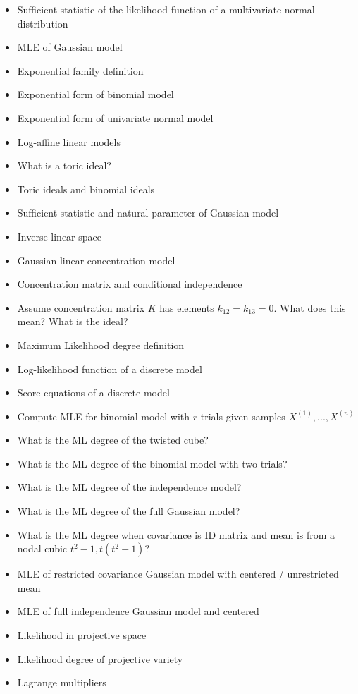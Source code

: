 \documentclass[a4paper, 11pt]{article}
\begin{document}
\begin{itemize}
  \item Sufficient statistic of the likelihood function of a multivariate normal distribution
  \item MLE of Gaussian model
  \item Exponential family definition
  \item Exponential form of binomial model
  \item Exponential form of univariate normal model
  \item Log-affine linear models
  \item What is a toric ideal?
  \item Toric ideals and binomial ideals
  \item Sufficient statistic and natural parameter of Gaussian model
  \item Inverse linear space
  \item Gaussian linear concentration model
  \item Concentration matrix and conditional independence
  \item Assume concentration matrix \( K \) has elements \( k_{12} = k_{13} = 0 \). What does this mean? What is the ideal?
  \item Maximum Likelihood degree definition
  \item Log-likelihood function of a discrete model 
  \item Score equations of a discrete model
  \item Compute MLE for binomial model with \( r \) trials given samples \( X^{(1)}, ..., X^{(n)} \)
  \item What is the ML degree of the twisted cube?
  \item What is the ML degree of the binomial model with two trials?
  \item What is the ML degree of the independence model?
  \item What is the ML degree of the full Gaussian model?
  \item What is the ML degree when covariance is ID matrix and mean is from a nodal cubic \( t^2 - 1,t(t^2 - 1) \)?
  \item MLE of restricted covariance Gaussian model with centered / unrestricted mean
  \item MLE of full independence Gaussian model and centered
  \item Likelihood in projective space 
  \item Likelihood degree of projective variety
  \item Lagrange multipliers

\end{itemize}
\end{document}
